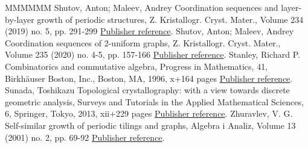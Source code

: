 \begin{thebibliography}{MMMMMM}
 Shutov, Anton; Maleev, Andrey Coordination sequences and layer-by-layer growth of periodic structures, Z. Kristallogr. Cryst. Mater., Volume 234 (2019) no. 5, pp. 291-299 \href{https://alco.centre-mersenne.org/articles/10.5802/alco.445/#SM19}{Publisher reference}.
 Shutov, Anton; Maleev, Andrey Coordination sequences of 2-uniform graphs, Z. Kristallogr. Cryst. Mater., Volume 235 (2020) no. 4-5, pp. 157-166 \href{https://alco.centre-mersenne.org/articles/10.5802/alco.445/#SM20a}{Publisher reference}.
 Stanley, Richard P. Combinatorics and commutative algebra, Progress in Mathematics, 41, Birkhäuser Boston, Inc., Boston, MA, 1996, x+164 pages \href{https://alco.centre-mersenne.org/articles/10.5802/alco.445/#Sta96}{Publisher reference}.
 Sunada, Toshikazu Topological crystallography: with a view towards discrete geometric analysis, Surveys and Tutorials in the Applied Mathematical Sciences, 6, Springer, Tokyo, 2013, xii+229 pages \href{https://alco.centre-mersenne.org/articles/10.5802/alco.445/#Sunada}{Publisher reference}.
 Zhuravlev, V. G. Self-similar growth of periodic tilings and graphs, Algebra i Analiz, Volume 13 (2001) no. 2, pp. 69-92 \href{https://alco.centre-mersenne.org/articles/10.5802/alco.445/#Zhu02}{Publisher reference}.
\end{thebibliography}
